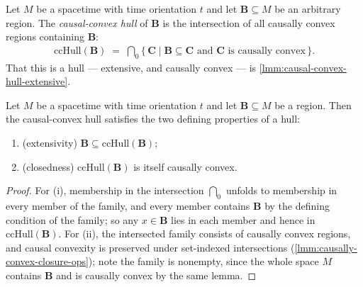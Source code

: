 \begin{definition}
    \label{def:causal-convex-hull}
    \leanok
    Let $M$ be a spacetime with time orientation $t$ and let $\mathbf{B} \subseteq M$ be an arbitrary region. The \emph{causal-convex hull} of $\mathbf{B}$ is the intersection of all causally convex regions containing $\mathbf{B}$:
    \begin{align}
        \mathrm{ccHull}(\mathbf{B}) \;=\; \bigcap_0 \{\, \mathbf{C} \mid \mathbf{B} \subseteq \mathbf{C} \text{ and } \mathbf{C} \text{ is causally convex} \,\}.
    \end{align}
    That this is a hull --- extensive, and causally convex --- is \ref{lmm:causal-convex-hull-extensive}.
\end{definition}

\begin{lemma}
    \label{lmm:causal-convex-hull-extensive}
    Let $M$ be a spacetime with time orientation $t$ and let $\mathbf{B} \subseteq M$ be a region. Then the causal-convex hull satisfies the two defining properties of a hull:
    \begin{enumerate}
        \item (extensivity) $\mathbf{B} \subseteq \mathrm{ccHull}(\mathbf{B})$;
        \item (closedness) $\mathrm{ccHull}(\mathbf{B})$ is itself causally convex.
    \end{enumerate}
\end{lemma}
\begin{proof}
    For (i), membership in the intersection $\bigcap_0$ unfolds to membership in every member of the family, and every member contains $\mathbf{B}$ by the defining condition of the family; so any $x \in \mathbf{B}$ lies in each member and hence in $\mathrm{ccHull}(\mathbf{B})$. For (ii), the intersected family consists of causally convex regions, and causal convexity is preserved under set-indexed intersections (\ref{lmm:causally-convex-closure-ops}); note the family is nonempty, since the whole space $M$ contains $\mathbf{B}$ and is causally convex by the same lemma.
\end{proof}

